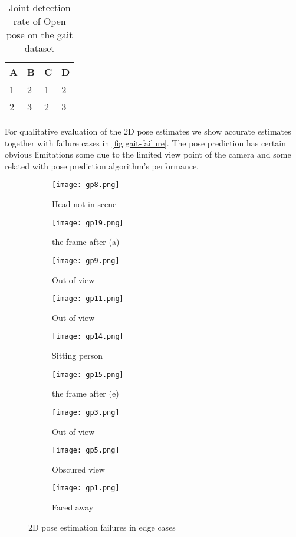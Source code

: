 \begin{table}[htpb]
    \centering
    \begin{tabular}{l l l l}
        \toprule
            A & B & C & D \\
        \midrule
            1 & 2 & 1 & 2 \\
            2 & 3 & 2 & 3 \\
        \bottomrule
    \end{tabular}
    \caption[Joint detection rate]{Joint detection rate of Open pose \parencite{cao2016realtime} on the gait dataset}\label{tab:open-pose-gait-rate}
\end{table}

For qualitative evaluation of the 2D pose estimates we show accurate estimates together with failure cases in \autoref{fig:gait-failure}. The pose prediction has certain obvious limitations some due to the limited view point of the camera and some related with pose prediction algorithm's performance. 

\begin{figure}[htpb]
	\centering
	\begin{subfigure}[b]{0.3\linewidth}
   		\texttt{[image: gp8.png]}
    	\caption{Head not in scene}
    \end{subfigure}
    \begin{subfigure}[b]{0.3\linewidth}
   		\texttt{[image: gp19.png]}
    	\caption{the frame after (a)}
    \end{subfigure}
    \begin{subfigure}[b]{0.3\linewidth}
   		\texttt{[image: gp9.png]}
    	\caption{Out of view}
    \end{subfigure}
    \begin{subfigure}[b]{0.3\linewidth}
   		\texttt{[image: gp11.png]}
    	\caption{Out of view}
    \end{subfigure}
    \begin{subfigure}[b]{0.3\linewidth}
   		\texttt{[image: gp14.png]}
    	\caption{Sitting person}
    \end{subfigure}
    \begin{subfigure}[b]{0.3\linewidth}
   		\texttt{[image: gp15.png]}
    	\caption{the frame after (e)}
    \end{subfigure}
    \begin{subfigure}[b]{0.3\linewidth}
   		\texttt{[image: gp3.png]}
    	\caption{Out of view}
    \end{subfigure}
    \begin{subfigure}[b]{0.3\linewidth}
   		\texttt{[image: gp5.png]} 
    	\caption{Obscured view}
    \end{subfigure}
    \begin{subfigure}[b]{0.3\linewidth}
   		\texttt{[image: gp1.png]} 
    	\caption{Faced away }
    \end{subfigure}
    \caption{2D pose estimation failures in edge cases}
    \label{fig:gait-failure}
\end{figure}

